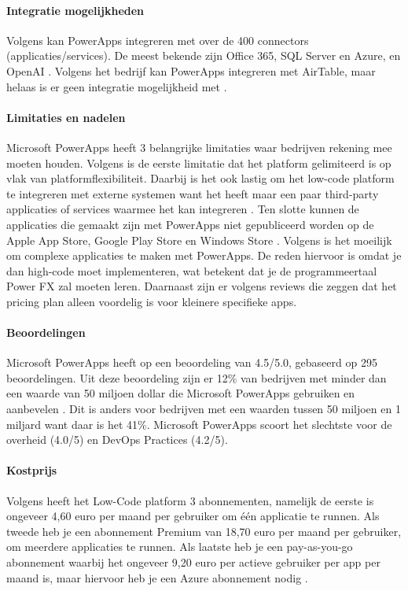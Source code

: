 \paragraph{Integratie mogelijkheden}
Volgens \textcite{Nguyen} kan PowerApps integreren met over de 400 connectors (applicaties/services). De meest bekende 
zijn Office 365, SQL Server en Azure,  en OpenAI \autocite{Nguyen}. Volgens het bedrijf \textcite{Microsoft2024} kan PowerApps integreren met 
AirTable, maar helaas is er geen integratie mogelijkheid met \textcite{MAKE.com2024a}.
\paragraph*{Limitaties en nadelen}
Microsoft PowerApps heeft 3 belangrijke limitaties waar bedrijven rekening mee moeten houden. 
Volgens \textcite{Gupta2023} is de eerste limitatie dat het platform gelimiteerd is op vlak van platformflexibiliteit.
Daarbij is het ook lastig om het low-code platform te integreren met externe systemen want het heeft maar een paar 
third-party applicaties of services waarmee het kan integreren \autocite{Gupta2023}. Ten slotte kunnen de applicaties die gemaakt zijn met
PowerApps niet gepubliceerd worden op de Apple App Store, Google Play Store en Windows Store \autocite{Gupta2023}.
Volgens \textcite{Nguyen} is het moeilijk om complexe applicaties te maken met PowerApps.
De reden hiervoor is omdat je dan high-code moet implementeren, wat betekent dat je de programmeertaal Power FX zal moeten leren.
Daarnaast zijn er volgens \textcite{Nguyen} reviews die zeggen dat het pricing plan alleen voordelig is voor kleinere specifieke apps.
\paragraph{Beoordelingen}
Microsoft PowerApps heeft op \textcite{Gartner2024} een beoordeling van 4.5/5.0, gebaseerd op 295 beoordelingen.
Uit deze beoordeling zijn er 12\% van bedrijven met minder dan een waarde van 50 miljoen dollar die Microsoft PowerApps gebruiken en aanbevelen \autocite{Gartner2024}.
Dit is anders voor bedrijven met een waarden tussen 50 miljoen en 1 miljard want daar is het 41\%.
Microsoft PowerApps scoort het slechtste voor de overheid (4.0/5) en DevOps Practices (4.2/5).

\paragraph{Kostprijs}
Volgens \textcite{Gupta2023} heeft het Low-Code platform 3 abonnementen, namelijk de eerste is ongeveer 4,60 euro per maand per gebruiker om één applicatie te runnen.
Als tweede heb je een abonnement Premium van 18,70 euro per maand per gebruiker, om meerdere applicaties te runnen. Als laatste heb je een pay-as-you-go abonnement
waarbij het ongeveer 9,20 euro per actieve gebruiker per app per maand is, maar hiervoor heb je een Azure abonnement nodig \autocite{Gupta2023}.
